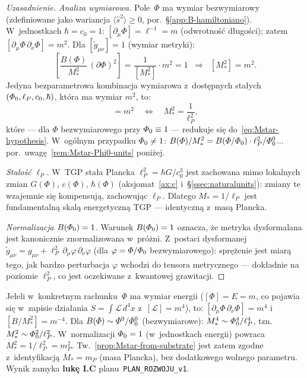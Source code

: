 \begin{proof}[Uzasadnienie]
\emph{Analiza wymiarowa.}
Pole~$\Phi$ ma wymiar bezwymiarowy (zdefiniowane jako wariancja
$\langle\hat{s}^2\rangle \geq 0$,
por.\ \S\ref{app:B-hamiltoniano}).
W~jednostkach $\hbar = c_0 = 1$: $[\partial_\mu\Phi] = \ell^{-1} = m$
(odwrotno\'s\'c d\l{}ugo\'sci);
zatem $[\partial_\mu\Phi\,\partial_\nu\Phi] = m^2$.
Dla $[\tilde{g}_{\mu\nu}] = 1$ (wymiar metryki):
\begin{equation}
  \left[\frac{B(\Phi)}{M_*^2}\,(\partial\Phi)^2\right]
  = \frac{1}{[M_*^2]}\cdot m^2 = 1
  \;\;\Longrightarrow\;\;
  [M_*^2] = m^2.
\end{equation}
Jedyna bezparametrowa kombinacja wymiarowa z~dost\k{e}pnych sta\l{}ych
$(\varPhi_0, \ell_P, c_0, \hbar)$, kt\'ora ma wymiar $m^2$, to:
\begin{equation}
  [M_*^2] = m^2
  \quad\Longleftrightarrow\quad
  M_*^2 = \frac{1}{\ell_P^2},
\end{equation}
kt\'ore --- dla $\Phi$ bezwymiarowego przy $\varPhi_0 \equiv 1$ ---
redukuje si\k{e} do~\eqref{eq:Mstar-hypothesis}.
W~og\'olnym przypadku $\varPhi_0 \neq 1$:
$B(\varPhi)/M_*^2 = B(\varPhi/\varPhi_0)\cdot\ell_P^2/\varPhi_0^0$...
por.\ uwag\k{e}~\ref{rem:Mstar-Phi0-units} poni\.zej.

\emph{Stalo\'s\'c $\ell_P$.}
W~TGP sta\l{}a Plancka $\ell_P^2 = \hbar G/c_0^3$ jest zachowana
mimo lokalnych zmian $G(\Phi)$, $c(\Phi)$, $\hbar(\Phi)$
(aksjomat~\ref{ax:c} i~\S\ref{ssec:naturalunits}):
zmiany te wzajemnie si\k{e} kompensuj\k{a}, zachowuj\k{a}c $\ell_P$.
Dlatego $M_* = 1/\ell_P$ jest fundamentaln\k{a} skal\k{a} energetyczn\k{a}
TGP --- identyczn\k{a} z~mas\k{a} Plancka.

\emph{Normalizacja $B(\varPhi_0) = 1$.}
Warunek $B(\varPhi_0) = 1$ oznacza, \.ze metryka dysformalana
jest kanonicznie znormalizowana w~pr\'o\.zni.
Z~postaci dysformanej $\tilde{g}_{\mu\nu} = g_{\mu\nu}
+ \ell_P^2\,\partial_\mu\varphi\,\partial_\nu\varphi$
(dla $\varphi = \varPhi/\varPhi_0$ bezwymiarowego):
spr\k{e}\.zenie jest miar\k{a} tego, jak bardzo perturbacja
$\varphi$ wchodzi do tensora metrycznego --- dok\l{}adnie
na poziomie $\ell_P^2$, co jest oczekiwane z~kwantowej
grawitacji.
\end{proof}

\begin{remark}%
\label{rem:Mstar-Phi0-units}
Je\l{}eli w~konkretnym rachunku~$\Phi$ ma wymiar energii
($[\Phi] = E = m$, co pojawia si\k{e} w~zapisie dzia\l{}ania
$S = \int\mathcal{L}\,d^4x$ z~$[\mathcal{L}] = m^4$),
to:
$[\partial_\mu\Phi\,\partial_\nu\Phi] = m^4$
i~$[B/M_*^2] = m^{-4}$.
Dla $B(\varPhi) \sim \varPhi^0/\varPhi_0^0$ (bezwymiarowe):
$M_*^4 \sim \varPhi_0^4/\ell_P^4$,
tzn.\ $M_*^2 \sim \varPhi_0^2/\ell_P^2$.
W~normalizacji $\varPhi_0 = 1$ (w~jednostkach energii) powraca
$M_*^2 = 1/\ell_P^2 = m_P^2$.
Tw.~\ref{prop:Mstar-from-substrate} jest zatem zgodne
z~identyfikacj\k{a} $M_* = m_P$ (masa Plancka),
bez dodatkowego wolnego parametru.
Wynik zamyka \textbf{luk\k{e} I.C} planu~\texttt{PLAN\_ROZWOJU\_v1}.
\end{remark}
